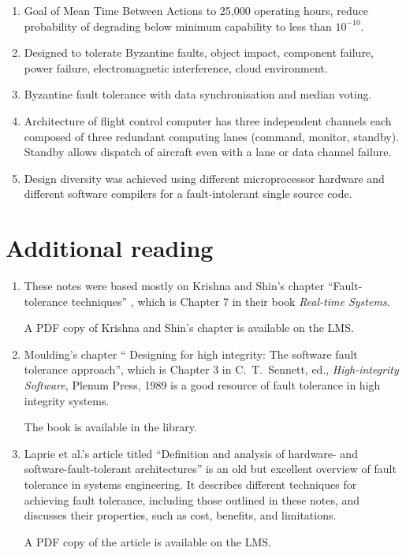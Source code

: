 \begin{enumerate}

 \item Goal of Mean Time Between Actions to 25,000 operating hours,
reduce probability of degrading below minimum capability to less
than \(10^{-10}\).

 \item Designed to tolerate Byzantine faults, object impact, component
failure, power failure, electromagnetic interference, cloud
environment.

 \item Byzantine fault tolerance with data synchronisation and median
voting.
 
 \item Architecture of flight control computer has three independent channels each composed of three redundant computing lanes (command, monitor, standby).  Standby allows dispatch of aircraft even with a lane or data channel failure.

 \item Design diversity was achieved using different microprocessor hardware and different software compilers for a fault-intolerant single source code.

\end{enumerate}




\section{Additional reading}

\begin{enumerate}

\item These notes were based mostly on Krishna and Shin's chapter ``Fault-tolerance techniques''  \cite{krishna99}, which is Chapter 7 in their book {\em Real-time Systems}.

 A PDF copy of Krishna and Shin's chapter is available on the LMS.

\item Moulding's chapter `` Designing for high integrity: The software fault tolerance approach'', which is Chapter 3 in C.\ T.\ Sennett, ed., {\em High-integrity Software}, Plenum Press, 1989 is a good resource of fault tolerance in high integrity systems. 

 The book is available in the library.

\item Laprie et al.'s article \cite{laprie90} titled ``Definition and analysis of hardware- and software-fault-tolerant architectures'' is an old but excellent overview of fault tolerance in systems engineering. It describes different techniques for achieving fault tolerance, including those outlined in these notes, and discusses their properties, such as cost, benefits, and limitations.

 A PDF copy of the article is available on the LMS.

\end{enumerate}



